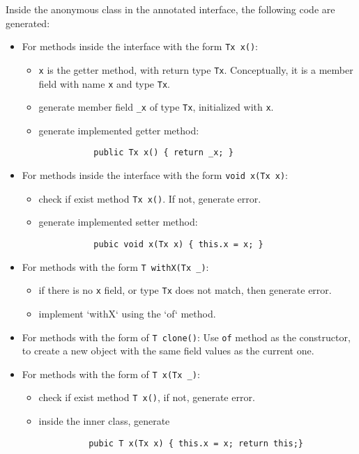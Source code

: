 Inside the anonymous class in the annotated interface, the following code are
generated:
\begin{itemize}
\item For methods inside the interface with the form \texttt{Tx x()}:
  \begin{itemize}
   \item \texttt{x} is the getter method, with return type
     \texttt{Tx}. Conceptually, it is a member field with name \texttt{x} and
     type \texttt{Tx}.
   \item generate member field \texttt{\_x} of type \texttt{Tx}, initialized
     with \texttt{x}.
   \item generate implemented getter method:
       \begin{lstlisting}
           public Tx x() { return _x; }
       \end{lstlisting}
   \end{itemize}

\item For methods inside the interface with the form \texttt{void x(Tx x)}:
  \begin{itemize}
    \item check if exist method \texttt{Tx x()}. If not, generate error.
    \item generate implemented setter method:
       \begin{lstlisting}
           pubic void x(Tx x) { this.x = x; }
       \end{lstlisting}
    \end{itemize}

\item For methods with the form \texttt{T withX(Tx \_)}:
  \begin{itemize}
  \item if there is no \texttt{x} field, or type \texttt{Tx} does not match,
    then generate error.
  \item implement `withX` using the `of` method.
  \end{itemize}

\item For methods with the form of \texttt{T clone()}: Use \texttt{of} method as
  the constructor, to create a new object with the same field values as the
  current one.

\item For methods with the form of \texttt{T x(Tx \_)}:
  \begin{itemize}
    \item check if exist method \texttt{T x()}, if not, generate error.
    \item inside the inner class, generate
      \begin{lstlisting}
          pubic T x(Tx x) { this.x = x; return this;}
      \end{lstlisting}
  \end{itemize}
\end{itemize}